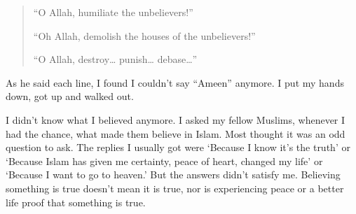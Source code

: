 \documentclass[12pt]{memoir}
\begin{document}
\begin{quote}
“O Allah, humiliate the unbelievers!”

“Oh Allah, demolish the houses of the unbelievers!”

“O Allah, destroy… punish… debase…”
\end{quote}

As he said each line, I found I couldn’t say “Ameen” anymore.
I put my hands down, got up and walked out.

I didn’t know what I believed anymore.
I asked my fellow Muslims, whenever I had the chance,
what made them believe in Islam.
Most thought it was an odd question to ask.
The replies I usually got were ‘Because I know it’s the truth’
or ‘Because Islam has given me certainty, peace of heart,
changed my life’ or ‘Because I want to go to heaven.’
But the answers didn’t satisfy me.
Believing something is true doesn’t mean it is true,
nor is experiencing peace or a better life proof that something is true.
\end{document}
